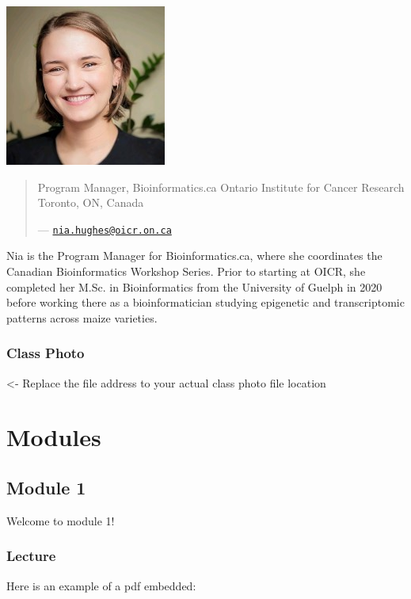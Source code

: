 \documentclass[
]{book}
\begin{document}
\includegraphics{./img/faculty/nia-hughes.jpeg}\\

\begin{quote}
Program Manager, Bioinformatics.ca
Ontario Institute for Cancer Research
Toronto, ON, Canada

--- \href{mailto:nia.hughes@oicr.on.ca}{\nolinkurl{nia.hughes@oicr.on.ca}}
\end{quote}

Nia is the Program Manager for Bioinformatics.ca, where she coordinates the Canadian
Bioinformatics Workshop Series. Prior to starting at OICR, she completed her M.Sc. in
Bioinformatics from the University of Guelph in 2020 before working there as a
bioinformatician studying epigenetic and transcriptomic patterns across maize varieties.

\section{Class Photo}\label{class-photo}

\textless- Replace the file address to your actual class photo file location

\part{Modules}\label{part-modules}

\chapter{Module 1}\label{module-1}

Welcome to module 1!

\section{Lecture}\label{lecture}

Here is an example of a pdf embedded:
\end{document}
